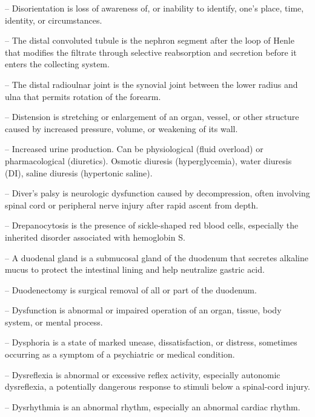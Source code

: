 -- Disorientation is loss of awareness of, or inability to identify, one's place, time, identity, or circumstances.

-- The distal convoluted tubule is the nephron segment after the loop of Henle that modifies the filtrate through selective reabsorption and secretion before it enters the collecting system.

-- The distal radioulnar joint is the synovial joint between the lower radius and ulna that permits rotation of the forearm.

-- Distension is stretching or enlargement of an organ, vessel, or other structure caused by increased pressure, volume, or weakening of its wall.

-- Increased urine production. Can be physiological (fluid overload) or pharmacological (diuretics). Osmotic diuresis (hyperglycemia), water diuresis (DI), saline diuresis (hypertonic saline).

-- Diver's palsy is neurologic dysfunction caused by decompression, often involving spinal cord or peripheral nerve injury after rapid ascent from depth.

-- Drepanocytosis is the presence of sickle-shaped red blood cells, especially the inherited disorder associated with hemoglobin S.

-- A duodenal gland is a submucosal gland of the duodenum that secretes alkaline mucus to protect the intestinal lining and help neutralize gastric acid.

-- Duodenectomy is surgical removal of all or part of the duodenum.

-- Dysfunction is abnormal or impaired operation of an organ, tissue, body system, or mental process.

-- Dysphoria is a state of marked unease, dissatisfaction, or distress, sometimes occurring as a symptom of a psychiatric or medical condition.

-- Dysreflexia is abnormal or excessive reflex activity, especially autonomic dysreflexia, a potentially dangerous response to stimuli below a spinal-cord injury.

-- Dysrhythmia is an abnormal rhythm, especially an abnormal cardiac rhythm.

